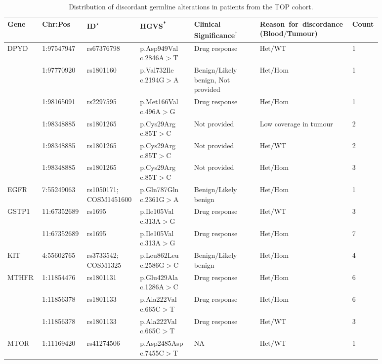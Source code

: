 \newpage
\begin{landscape}

\begin{longtable}{p{0.09\linewidth}|p{0.1\linewidth}p{0.12\linewidth}p{0.14\linewidth}p{0.17\linewidth}p{0.2\linewidth}p{0.06\linewidth}}
\caption{Distribution of discordant germline alterations in patients from the TOP cohort.}
\label{tbl:freq_discordant_germline}
		\\
		\hline
		Gene & Chr:Pos & ID\textsuperscript{$\star$} & HGVS\textsuperscript{*} & Clinical Significance\textsuperscript{$\dagger$} & \hbox{Reason for discordance} (Blood$/$Tumour) & Count
		\\
		\hline
		DPYD & 1:97547947 & rs67376798 & p.Asp949Val c.2846A$>$T & Drug response & Het$/$WT & 1
		\\
		& 1:97770920 & rs1801160 & p.Val732Ile c.2194G$>$A & Benign$/$Likely benign, Not provided & Het$/$Hom & 1
		\\
		& 1:98165091 & rs2297595 & p.Met166Val c.496A$>$G & Drug response &  Het$/$Hom & 1
		\\
		& 1:98348885 & rs1801265 & p.Cys29Arg c.85T$>$C & Not provided & Low coverage in tumour & 2
		\\
		& 1:98348885 & rs1801265 & p.Cys29Arg c.85T$>$C & Not provided & Het$/$WT & 2
		\\
		& 1:98348885 & rs1801265 & p.Cys29Arg c.85T$>$C & Not provided & Het$/$Hom & 3
		\\
		\hline
		EGFR & 7:55249063 & rs1050171; COSM1451600 & p.Gln787Gln c.2361G$>$A & Benign$/$Likely benign & Het$/$Hom & 1
		\\
		\hline
		GSTP1 & 11:67352689 & rs1695 & p.Ile105Val c.313A$>$G & Drug response & Het$/$WT & 3
		\\
		& 11:67352689 & rs1695 & p.Ile105Val c.313A$>$G & Drug response & Het$/$Hom & 7
		\\
		\hline
		KIT & 4:55602765 & rs3733542; COSM1325 & p.Leu862Leu c.2586G$>$C & Benign$/$Likely benign & Het$/$Hom & 4
		\\
		\hline
		MTHFR & 1:11854476 & rs1801131 & p.Glu429Ala c.1286A$>$C & Drug response & Het$/$Hom & 6
		\\
		& 1:11856378 & rs1801133 & p.Ala222Val c.665C$>$T & Drug response & Het$/$Hom & 6
		\\
		& 1:11856378 & rs1801133 & p.Ala222Val c.665C$>$T & Drug response & Het$/$WT & 3
		\\
		\hline
		MTOR & 1:11169420 & rs41274506 & p.Asp2485Asp c.7455C$>$T & NA & Het$/$WT & 1
		\\

\end{longtable}
\end{landscape}
